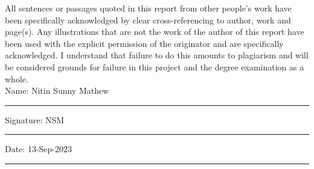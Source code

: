 \documentclass[11pt,oneside]{book}
\begin{document}
All sentences or passages quoted in this report from other people's work have been specifically acknowledged by clear cross-referencing to author, work and page(s). Any illustrations that are not the work of the author of this report have been used with the explicit permission of the originator and are specifically acknowledged. I understand that failure to do this amounts to plagiarism and will be considered grounds for failure in this project and the degree examination as a whole.\\[1cm]

\noindent Name: Nitin Sunny Mathew\\[1mm]
\rule[1em]{25em}{0.5pt}

\noindent Signature: NSM\\[1mm]
\rule[1em]{25em}{0.5pt}

\noindent Date: 13-Sep-2023\\[1mm]
\rule[1em]{25em}{0.5pt}



\tableofcontents
\listoffigures
\listoftables


\mainmatter












\begin{appendices}
    
    
\end{appendices}
\end{document}

